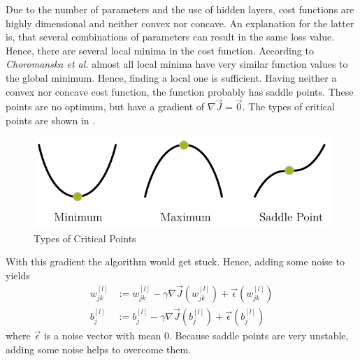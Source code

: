 Due to the number of parameters and the use of hidden layers, cost functions are highly dimensional and neither convex nor concave.
An explanation for the latter is, that several combinations of parameters can result in the same loss value.
Hence, there are several local minima in the cost function.
According to \textit{Choromanska et al.}\cite{DBLP:journals/corr/ChoromanskaHMAL14} almost all local minima have very similar function values to the global minimum.
Hence, finding a local one is sufficient.
Having neither a convex nor concave cost function, the function probably has saddle points.
These points are no optimum, but have a gradient of $\nabla \vec{J} = \vec{0}$.
The types of critical points are shown in .
\begin{figure}
	\centering
	\includegraphics[]{images/gradient_descent_types.pdf}
	\caption{Types of Critical Points}
	\label{fig:critical-points}
\end{figure}
With this gradient the algorithm would get stuck.
Hence, adding some noise to  yields
\begin{subequations}
	\begin{align}
		w^{[l]}_{jk} &:= w^{[l]}_{jk} - \gamma \nabla \vec{J}(w^{[l]}_{jk}) + \vec{\epsilon}(w^{[l]}_{jk}) \\
		b^{[l]}_j &:= b^{[l]}_j - \gamma \nabla \vec{J}(b^{[l]}_j) + \vec{\epsilon}(b^{[l]}_j)
	\end{align}
\end{subequations}
where $\vec{\epsilon}$ is a noise vector with mean 0.
Because saddle points are very unstable, adding some noise helps to overcome them.